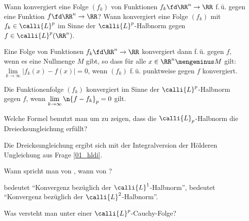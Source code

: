 \begin{frage}
  Wann konvergiert eine Folge $(f_k)$ von Funktionen $f_k \fd \RR^n\to \RR$ 
  f.\,ü. gegen eine Funktion $f\fd \RR^n \to \RR$? 
  Wann konvergiert eine Folge $(f_k)$ mit $f_k\in\calli{L}^p$ im Sinne der 
  $\calli{L}^p$-Halbnorm gegen $f\in\calli{L}^p(\RR^n)$. 
\end{frage} 

\begin{antwort}
  Eine Folge von Funktionen $f_k\fd \RR^n\to \RR$ konvergiert dann 
  f.\,ü. gegen $f$, wenn es eine Nullmenge $M$ gibt, so dass für alle 
  $x\in \RR^n\mengeminus M$ gilt: $\lim\limits_{k\to\infty} |f_k(x)-f(x)| =0$, 
  {\dasheisst} wenn $(f_k)$ f.\,ü. punktweise gegen $f$ konvergiert. 

  Die Funktionenfolge $(f_k)$ konvergiert im Sinne der $\calli{L}^p$-Halbnorm 
  gegen $f$, wenn $\lim\limits_{k\to\infty} \n{ f-f_k }_p=0$ gilt. 
  \AntEnd
\end{antwort}

\begin{frage}
  Welche Formel benutzt man um zu zeigen, dass die 
  $\calli{L}_p$-Halbnorm die Dreiecksungleichung erfüllt?
\end{frage}

\begin{antwort}
  Die Dreicksungleichung ergibt sich mit der Integralversion der 
  Hölder\sch en Ungleichung aus Frage \ref{01_hldi}. 
  \AntEnd
\end{antwort}

\begin{frage}
  Wann spricht man von , 
  wann von ?
\end{frage}

\begin{antwort}
   bedeutet "`Konvergenz bezüglich 
  der $\calli{L}^1$-Halbnorm"', 
   bedeutet 
  "`Konvergenz bezüglich der $\calli{L}^2$-Halbnorm"'. \AntEnd
\end{antwort} 

\begin{frage}
  Was versteht man unter einer $\calli{L}^p$-Cauchy-Folge?
\end{frage}

